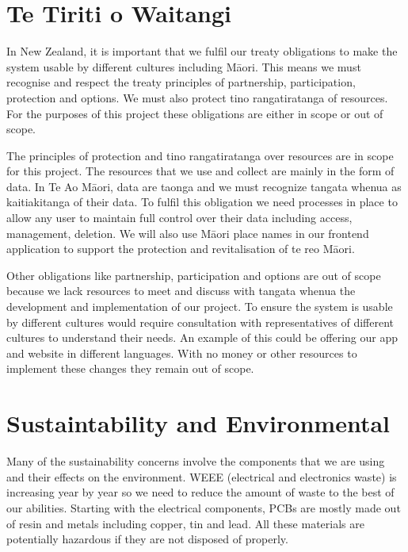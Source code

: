 \section{Te Tiriti o Waitangi}

In New Zealand, it is important that we fulfil our treaty obligations to make the system usable by different cultures including Māori. This means we must recognise and respect the treaty principles of partnership, participation, protection and options. We must also protect tino rangatiratanga of resources. For the purposes of this project these obligations are either in scope or out of scope. 

The principles of protection and tino rangatiratanga over resources are in scope for this project. The resources that we use and collect are mainly in the form of data. In Te Ao Māori, data are taonga and we must recognize tangata whenua as kaitiakitanga of their data. To fulfil this obligation we need processes in place to allow any user to maintain full control over their data including access, management, deletion. We will also use Māori place names in our frontend application to support the protection and revitalisation of  te reo Māori.   

Other obligations like partnership, participation and options are out of scope because we lack resources to meet and discuss with tangata whenua the development and implementation of our project. To ensure the system is usable by different cultures would require consultation with representatives of different cultures to understand their needs. An example of this could be offering our app and website in different languages. With no money or other resources to implement these changes they remain out of scope. 


\section{Sustaintability and Environmental}

Many of the sustainability concerns involve the components that we are using and their effects on the environment. WEEE (electrical and electronics waste) is increasing year by year so we need to reduce the amount of waste to the best of our abilities. Starting with the electrical components, PCBs are mostly made out of resin and metals including copper, tin and lead. All these materials are potentially hazardous if they are not disposed of properly.

